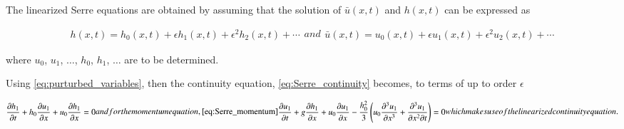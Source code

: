 \documentclass[SingleSpace,12pt]{Serre_ASCE}
\begin{document}
The linearized Serre equations are obtained by assuming that  the solution of $\bar{u}(x,t)$ and $h(x,t)$ can be expressed as
\begin{linenomath*}
\begin{subequations}\label{eq:purturbed_variables}
\begin{gather}
h(x,t) = h_0(x,t) + \epsilon h_1(x,t) + \epsilon^2 h_2(x,t) + \cdots
\end{gather}
and
\begin{gather}
\bar{u}(x,t) = u_0(x,t) + \epsilon u_1(x,t) + \epsilon^2 u_2(x,t) + \cdots
\end{gather}
\end{subequations}
\end{linenomath*}
where $u_0$, $u_1$, $\ldots$, $h_0$, $h_1$, $\ldots$ are to be determined.

Using \eqref{eq:purturbed_variables}, then the continuity equation, \eqref{eq:Serre_continuity} becomes, to terms of up to order $\epsilon$
\begin{linenomath*}
\begin{subequations}\label{eq:linearized_Serre}
\begin{gather}\label{eq:linearized_Serre_continuity}
\dfrac{\partial h_1}{\partial  t} + h_0 \dfrac{\partial u_1}{\partial x} +  u_0 \dfrac{\partial h_1}{\partial x} = 0
\end{gather}
and for the momentum equation, \eqref{eq:Serre_momentum}
\begin{gather}\label{eq:linearized_Serre_momentum}
\dfrac{\partial u_1}{\partial t} +  g \dfrac{\partial h_1}{\partial x} + u_0 \dfrac{\partial u_1}{\partial x} -  \dfrac{h_0^2}{3} \left ( u_0 \dfrac{\partial^3 u_1}{\partial x^3}  + \dfrac{\partial^3 u_1}{\partial x^2 \partial t} \right )  = 0
\end{gather}
which makes use of the linearized  continuity equation.
\end{subequations}
\end{linenomath*}
\end{document}
